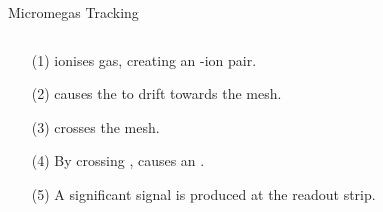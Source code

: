 \begin{frame}{Micromegas Tracking}
    \label{20.01::micromegas_tracking}

    \vspace{18pt}

    \begin{columns}[onlytextwidth,T]
        \begin{column}{.34\linewidth}
            \begin{enumerate}
                \item[(1)]
                     ionises gas, creating an -ion pair.

                \vspace{2pt}
                \item[(2)]
                     causes the  to drift towards the mesh.

                \vspace{2pt}
                \item[(3)]
                     crosses the mesh.

                \vspace{2pt}
                \item[(4)]
                    By crossing ,  causes an .

                \vspace{2pt}
                \item[(5)]
                    A significant signal is produced at the readout strip.
            \end{enumerate}
        \end{column}

        \begin{column}{.64\linewidth}
            \vspace{0pt}
            \begin{center}
            \end{center}
        \end{column}
    \end{columns}

\end{frame}
